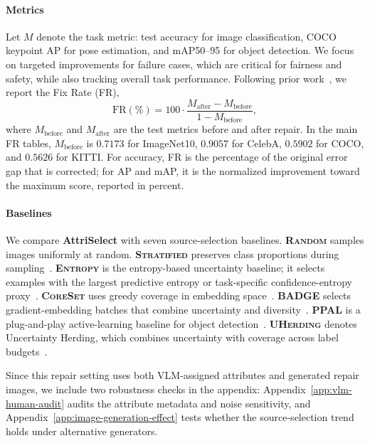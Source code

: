 \documentclass{article}
\newcommand{\modelname}{AttriSelect}
\newcommand{\model}{\textcolor{darkteal}{\textbf{\modelname}}\xspace}
\begin{document}
\paragraph{Metrics}
Let $M$ denote the task metric: test accuracy for image classification, COCO keypoint AP for pose estimation, and mAP50--95 for object detection. We focus on targeted improvements for failure cases, which are critical for fairness and safety, while also tracking overall task performance. Following prior work~\citep{lai2023improvingpredictionbackwardcompatiblilitynlp,xu2025safefix}, we report the Fix Rate (FR),
\begin{equation}
\mathrm{FR}(\%)=100\cdot\frac{M_{\mathrm{after}}-M_{\mathrm{before}}}{1-M_{\mathrm{before}}},
\end{equation}
where $M_{\mathrm{before}}$ and $M_{\mathrm{after}}$ are the test metrics before and after repair. In the main FR tables, $M_{\mathrm{before}}$ is $0.7173$ for ImageNet10, $0.9057$ for CelebA, $0.5902$ for COCO, and $0.5626$ for KITTI. For accuracy, FR is the percentage of the original error gap that is corrected; for AP and mAP, it is the normalized improvement toward the maximum score, reported in percent.

\paragraph{Baselines}
We compare \model with seven source-selection baselines. \textbf{\textsc{Random}} samples images uniformly at random. \textbf{\textsc{Stratified}} preserves class proportions during sampling~\citep{neyman1934two}. \textbf{\textsc{Entropy}} is the entropy-based uncertainty baseline; it selects examples with the largest predictive entropy or task-specific confidence-entropy proxy~\citep{settles2009active}. \textbf{\textsc{CoreSet}} uses greedy coverage in embedding space~\citep{sener2018active}. \textbf{\textsc{BADGE}} selects gradient-embedding batches that combine uncertainty and diversity~\citep{ash2020deep}. \textbf{\textsc{PPAL}} is a plug-and-play active-learning baseline for object detection~\citep{yang2024ppal}. \textbf{\textsc{UHerding}} denotes Uncertainty Herding, which combines uncertainty with coverage across label budgets~\citep{bae2025uncertainty}.

Since this repair setting uses both VLM-assigned attributes and generated repair images, we include two robustness checks in the appendix: Appendix~\ref{app:vlm-human-audit} audits the attribute metadata and noise sensitivity, and Appendix~\ref{app:image-generation-effect} tests whether the source-selection trend holds under alternative generators.
\end{document}
